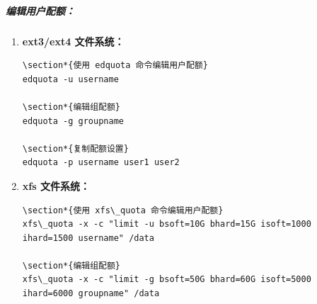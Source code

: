 \documentclass[12pt,UTF8]{ctexbook}
\begin{document}
\subparagraph{编辑用户配额：}
\begin{enumerate}
    \item \textbf{ext3/ext4 文件系统：}
    \begin{verbatim}
\section*{使用 edquota 命令编辑用户配额}
edquota -u username

\section*{编辑组配额}
edquota -g groupname

\section*{复制配额设置}
edquota -p username user1 user2
    \end{verbatim}
    
    \item \textbf{xfs 文件系统：}
    \begin{verbatim}
\section*{使用 xfs\_quota 命令编辑用户配额}
xfs\_quota -x -c "limit -u bsoft=10G bhard=15G isoft=1000 ihard=1500 username" /data

\section*{编辑组配额}
xfs\_quota -x -c "limit -g bsoft=50G bhard=60G isoft=5000 ihard=6000 groupname" /data
    \end{verbatim}
\end{enumerate}
\end{document}
